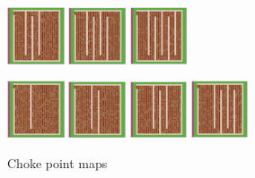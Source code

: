 \documentclass[12pt,letterpaper]{article}
\begin{document}
\begin{figure}[!ht]
\begin{minipage}[b]{\linewidth}
    \includegraphics[width=0.15\textwidth]{./figures/chokepoint_2_c.png}
    \includegraphics[width=0.15\textwidth]{./figures/chokepoint_2_d.png}
    \includegraphics[width=0.15\textwidth]{./figures/chokepoint_2_e.png}
  \end{minipage}
  \begin{minipage}[b]{\linewidth}
    \includegraphics[width=0.15\textwidth]{./figures/chokepoint_3_a.png}
    \includegraphics[width=0.15\textwidth]{./figures/chokepoint_3_b.png}
    \includegraphics[width=0.15\textwidth]{./figures/chokepoint_3_c.png}
    \includegraphics[width=0.15\textwidth]{./figures/chokepoint_3_d.png}
  \end{minipage}
  \caption{Choke point maps}
  \label{chokepointmaps}
\end{figure}
\end{document}
